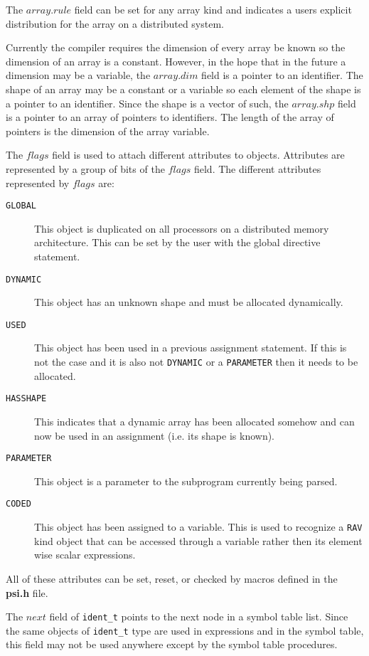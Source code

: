 The $array.rule$ field can be set for any array kind and indicates a users
explicit distribution for the array on a distributed system.

Currently the compiler requires the dimension of every array be known
so the dimension of an array is a constant.  However, in the hope that in
the future a dimension may be a variable, the $array.dim$ field is a pointer
to an identifier.  The shape of an array may be a constant or a variable so
each element of the shape is a pointer to an identifier.  Since the shape
is a vector of such, the $array.shp$ field is a pointer to an array of pointers
to identifiers.  The length of the array of pointers is the dimension of the
array variable.

The $flags$ field is used to attach different attributes to objects.  
Attributes are represented by a group of bits of the $flags$ field. The 
different attributes represented by $flags$ are:

\begin{description}
\item[{\tt GLOBAL}] This object is duplicated on all processors on a distributed
memory architecture.  This can be set by the user with the global directive
statement.

\item[{\tt DYNAMIC}] This object has an unknown shape and must be allocated 
dynamically.

\item[{\tt USED}] This object has been used in a previous assignment statement.  If 
this is not the case and it is also not {\tt DYNAMIC} or a {\tt PARAMETER} then it needs
to be allocated.

\item[{\tt HASSHAPE}] This indicates that a dynamic array has been allocated somehow
and can now be used in an assignment (i.e. its shape is known).

\item[{\tt PARAMETER}] This object is a parameter to the subprogram currently being
parsed.

\item[{\tt CODED}] This object has been assigned to a variable.  This is used to
recognize a {\tt RAV} kind object that can be accessed through a variable rather
then its element wise scalar expressions.
\end{description}
All of these attributes can be set, reset, or checked by macros defined in
the {\bf psi.h} file.

The $next$ field of {\tt ident\_t} points to the next node in a symbol table list.
Since the same objects of {\tt ident\_t} type are used in expressions and in the 
symbol table, this field may not be used anywhere except by the symbol table
procedures.

